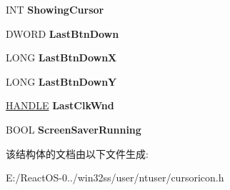 \begin{DoxyCompactItemize}
\item 
\mbox{\label{struct___s_y_s_t_e_m___c_u_r_s_o_r_i_n_f_o_a2f92af74e1b1c8f967bd0034fea771ad}} 
I\+NT {\bfseries Showing\+Cursor}
\item 
\mbox{\label{struct___s_y_s_t_e_m___c_u_r_s_o_r_i_n_f_o_ace142819d4e6b478122544f963d2ebac}} 
D\+W\+O\+RD {\bfseries Last\+Btn\+Down}
\item 
\mbox{\label{struct___s_y_s_t_e_m___c_u_r_s_o_r_i_n_f_o_abbe0b68d32fc49a95d928696c2d56145}} 
L\+O\+NG {\bfseries Last\+Btn\+DownX}
\item 
\mbox{\label{struct___s_y_s_t_e_m___c_u_r_s_o_r_i_n_f_o_a618ea3730235a1d671151eed6ac1170d}} 
L\+O\+NG {\bfseries Last\+Btn\+DownY}
\item 
\mbox{\label{struct___s_y_s_t_e_m___c_u_r_s_o_r_i_n_f_o_aa9dddf1d9326127f8c950414698715a6}} 
\hyperlink{interfacevoid}{H\+A\+N\+D\+LE} {\bfseries Last\+Clk\+Wnd}
\item 
\mbox{\label{struct___s_y_s_t_e_m___c_u_r_s_o_r_i_n_f_o_a0345ddef6ac546a150e9e7abd59aa64a}} 
B\+O\+OL {\bfseries Screen\+Saver\+Running}
\end{DoxyCompactItemize}


该结构体的文档由以下文件生成\+:\begin{DoxyCompactItemize}
\item 
E\+:/\+React\+O\+S-\/0../win32ss/user/ntuser/cursoricon.\+h\end{DoxyCompactItemize}
